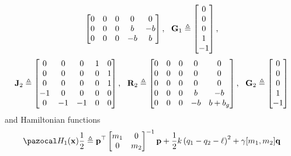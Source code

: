 \begin{exmp}
\begin{equation}
\begin{bmatrix}
            0&0&0&0&0\\
            0&0&0&b&-b\\
            0&0&0&-b&b\\
        \end{bmatrix},~~
        \mathbf{G}_1\triangleq
        \begin{bmatrix}
            0\\0\\0\\1\\-1
        \end{bmatrix},
    \end{equation}
    \begin{equation}
        \mathbf{J}_2\triangleq
        \begin{bmatrix}
            0&0&0&1&0\\
            0&0&0&0&1\\
            0&0&0&0&1\\
            -1&0&0&0&0\\
            0&-1&-1&0&0\\
        \end{bmatrix},~~
        \mathbf{R}_2\triangleq
        \begin{bmatrix}
            0&0&0&0&0\\
            0&0&0&0&0\\
            0&0&0&0&0\\
            0&0&0&b&-b\\
            0&0&0&-b&b+b_g\\
        \end{bmatrix},~~
        \mathbf{G}_2\triangleq
        \begin{bmatrix}
            0\\0\\0\\1\\-1
        \end{bmatrix}
    \end{equation}
    and Hamiltonian functions
    \begin{align}
        &\Ha_1(\xb) \frac{1}{2}\triangleq \pb^\top\begin{bmatrix}m_1&0\\0&m_2\end{bmatrix}^{-1}\pb + \frac{1}{2}k\left(q_1-q_2-\ell\right)^2 + \gamma[m_1,m_2]\qb \\

\end{align}
\end{exmp}
